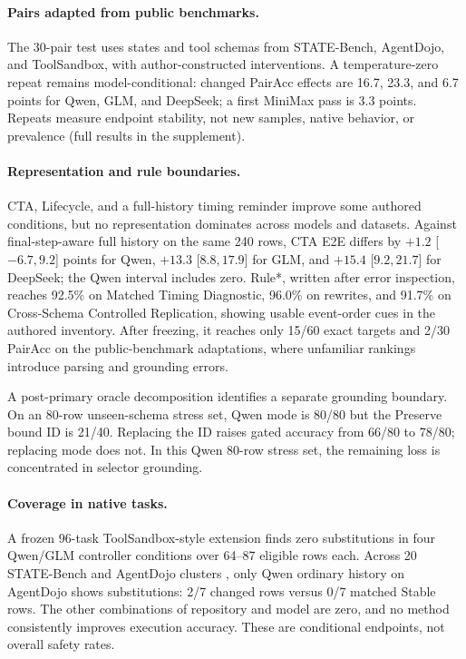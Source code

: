 \documentclass[letterpaper]{article}
\newcommand{\PrimaryDiagnostic}{Matched Timing Diagnostic}
\newcommand{\NewSchemaReplication}{Cross-Schema Controlled Replication}
\begin{document}
\paragraph{Pairs adapted from public benchmarks.}
The 30-pair test uses states and tool schemas from STATE-Bench, AgentDojo, and ToolSandbox, with
author-constructed interventions. A temperature-zero repeat remains model-conditional: changed
PairAcc effects are 16.7, 23.3, and 6.7 points for Qwen, GLM, and DeepSeek; a first MiniMax pass is
3.3 points. Repeats measure endpoint stability, not new samples, native behavior, or prevalence
(full results in the supplement).

\paragraph{Representation and rule boundaries.}
CTA, Lifecycle, and a full-history timing reminder improve some authored conditions, but no
representation dominates across models and datasets. Against final-step-aware full history on the
same 240 rows, CTA E2E differs by $+1.2$ [$-6.7,9.2$] points for Qwen, $+13.3$ [$8.8,17.9$] for
GLM, and $+15.4$ [$9.2,21.7$] for DeepSeek; the Qwen interval includes zero. Rule*, written after
error inspection,
reaches 92.5\% on \PrimaryDiagnostic{}, 96.0\% on rewrites, and 91.7\% on
\NewSchemaReplication{}, showing usable event-order cues in the authored inventory. After freezing,
it reaches only 15/60 exact targets and 2/30 PairAcc on the public-benchmark adaptations, where
unfamiliar rankings introduce parsing and grounding errors.

A post-primary oracle decomposition identifies a separate grounding boundary. On an 80-row
unseen-schema stress set, Qwen mode is 80/80 but the Preserve bound ID is 21/40. Replacing the ID
raises gated accuracy from 66/80 to 78/80; replacing mode does not. In this Qwen 80-row stress set,
the remaining loss is concentrated in selector grounding.

\paragraph{Coverage in native tasks.}
A frozen 96-task ToolSandbox-style extension finds zero substitutions in four Qwen/GLM controller
conditions over 64--87 eligible rows each.
Across 20 STATE-Bench and AgentDojo clusters
\cite{microsoft2026statebench,debenedetti2024agentdojo}, only Qwen ordinary history on AgentDojo
shows substitutions: 2/7 changed rows versus 0/7 matched Stable rows. The other combinations of
repository and model are zero, and no method consistently improves execution accuracy. These are
conditional endpoints, not overall safety rates.
\end{document}
